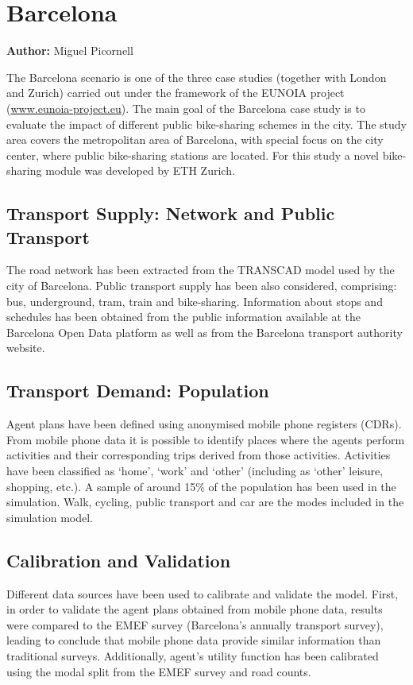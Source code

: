 \section{Barcelona}
\label{sec:barcelona}
\hfill \textbf{Author:} Miguel Picornell

The Barcelona scenario is one of the three case studies (together with London and Zurich) carried out under the framework of the EUNOIA project (\url{www.eunoia-project.eu}). The main goal of the Barcelona case study is to evaluate the impact of different public bike-sharing schemes in the city. The study area covers the metropolitan area of Barcelona, with special focus on the city center, where public bike-sharing stations are located. For this study a novel bike-sharing module was developed by ETH Zurich.

\subsection{Transport Supply: Network and Public Transport}
The road network has been extracted from the TRANSCAD model used by the city of Barcelona.  Public transport supply has been also considered, comprising: bus, underground, tram, train and bike-sharing. Information about stops and schedules has been obtained from the public information available at the Barcelona Open Data platform as well as from the Barcelona transport authority website. 

\subsection{Transport Demand: Population} 
Agent plans have been defined using anonymised mobile phone registers (CDRs). From mobile phone data it is possible to identify places where the agents perform activities and their corresponding trips derived from those activities. Activities have been classified as ‘home’, ‘work’ and ‘other’ (including as ‘other’ leisure, shopping, etc.). A sample of around 15\% of the population has been used in the simulation. Walk, cycling, public transport and car are the modes included in the simulation model.

\subsection{Calibration and Validation}
Different data sources have been used to calibrate and validate the model. First, in order to validate the agent plans obtained from mobile phone data, results were compared to the EMEF survey (Barcelona’s annually transport survey), leading to conclude that mobile phone data provide similar information than traditional surveys. Additionally, agent’s utility function has been calibrated using the modal split from the EMEF survey and road counts.

